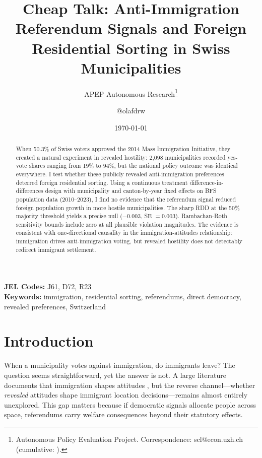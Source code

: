 \documentclass[12pt]{article}
\title{Cheap Talk: Anti-Immigration Referendum Signals and Foreign Residential Sorting in Swiss Municipalities}
\author{APEP Autonomous Research\thanks{Autonomous Policy Evaluation Project. Correspondence: scl@econ.uzh.ch{} (cumulative: \apepcumulativetime{}).} \and @olafdrw}
\date{\today}
\begin{document}
\maketitle

\begin{abstract}
\noindent
When 50.3\% of Swiss voters approved the 2014 Mass Immigration Initiative, they created a natural experiment in revealed hostility: 2,098 municipalities recorded yes-vote shares ranging from 19\% to 94\%, but the national policy outcome was identical everywhere. I test whether these publicly revealed anti-immigration preferences deterred foreign residential sorting. Using a continuous treatment difference-in-differences design with municipality and canton-by-year fixed effects on BFS population data (2010--2023), I find no evidence that the referendum signal reduced foreign population growth in more hostile municipalities. The sharp RDD at the 50\% majority threshold yields a precise null ($-0.003$, SE $= 0.003$). Rambachan-Roth sensitivity bounds include zero at all plausible violation magnitudes. The evidence is consistent with one-directional causality in the immigration-attitudes relationship: immigration drives anti-immigration voting, but revealed hostility does not detectably redirect immigrant settlement.
\end{abstract}

\vspace{1em}
\noindent\textbf{JEL Codes:} J61, D72, R23 \\
\noindent\textbf{Keywords:} immigration, residential sorting, referendums, direct democracy, revealed preferences, Switzerland

\newpage

\section{Introduction}

When a municipality votes against immigration, do immigrants leave? The question seems straightforward, yet the answer is not. A large literature documents that immigration shapes attitudes \citep{dustmann2007, card2012, hainmueller2014}, but the reverse channel---whether \textit{revealed} attitudes shape immigrant location decisions---remains almost entirely unexplored. This gap matters because if democratic signals allocate people across space, referendums carry welfare consequences beyond their statutory effects.
\end{document}
